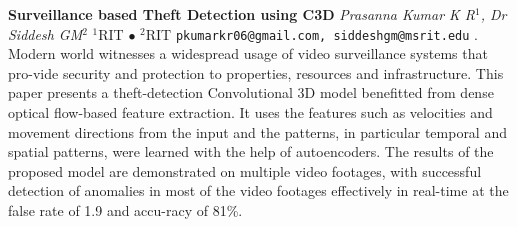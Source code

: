 
    \begin{conf-abstract}[]
        {\textbf{Surveillance based Theft Detection using C3D }}
        {\textit{Prasanna Kumar K R$^{1}$, Dr Siddesh GM$^{2}$}}
        {$^{1}$RIT $\bullet$ $^{2}$RIT}
        {\texttt{pkumarkr06@gmail.com, siddeshgm@msrit.edu}}
        {. Modern world witnesses a widespread usage of video surveillance systems that pro-vide security and protection to properties, resources and infrastructure. This paper presents a theft-detection Convolutional 3D model benefitted from dense optical flow-based feature extraction. It uses the features such as velocities and movement directions from the input and the patterns, in particular temporal and spatial patterns, were learned with the help of autoencoders. The results of the proposed model are demonstrated on multiple video footages, with successful detection of anomalies in most of the video footages effectively in real-time at the false rate of 1.9 and accu-racy of 81\%.}
    \end{conf-abstract}
        